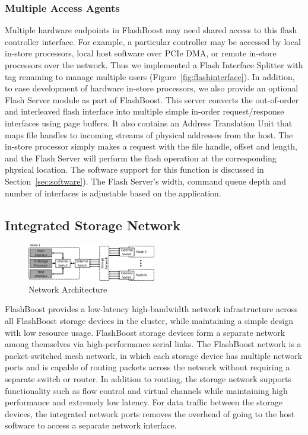 \subsubsection{Multiple Access Agents}

Multiple hardware endpoints in FlashBoost may need shared access to this
flash controller interface. For example, a particular controller may
be accessed by local in-store processors, local host software over PCIe
DMA, or remote in-store processors over the network. Thus we implemented a
Flash Interface Splitter with tag renaming to manage multiple users
(Figure~\ref{fig:flashinterface}). In addition, 
to ease development of hardware in-store processors,
we also provide an optional Flash Server module as part of FlashBoost. This server
converts the out-of-order and interleaved flash interface into
multiple simple in-order request/response interfaces
using page buffers. It also contains an Address Translation Unit that 
maps file handles to incoming streams of physical addresses from the host. The in-store processor
simply makes a request with the file handle, offset and length, and the Flash Server will perform
the flash operation at the corresponding physical location. The software
support for this function is discussed in Section~\ref{sec:software}). The Flash
Server's width, command queue depth and number of interfaces is adjustable 
based on the application.

\subsection{Integrated Storage Network}

\begin{figure}[h]
	\begin{center}
	\includegraphics[width=0.5\textwidth]{figures/network-architecture-crop.pdf}
	\caption{Network Architecture}
	\label{fig:networkinterface}
	\end{center}
\end{figure}


FlashBoost provides a low-latency high-bandwidth network infrastructure across
all FlashBoost storage devices in the cluster, while maintaining a simple design
with low resource usage. FlashBoost storage devices form a separate network
among themselves via high-performance serial links.  The FlashBoost network is a
packet-switched mesh network, in which each storage device has multiple network
ports and is capable of routing packets across the network without requiring a
separate switch or router.  In addition to routing, the storage network supports functionality such as
flow control and virtual channels while maintaining high performance and
extremely low latency.  For data traffic between the storage devices, the
integrated network ports removes the overhead of going to the host software to
access a separate network interface.

